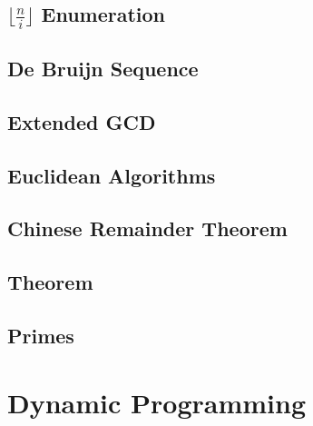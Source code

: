 \documentclass[a4paper,10pt,twocolumn,oneside]{article}
\begin{document}
\subsection{$\lfloor \frac{n}{i} \rfloor$ Enumeration}

\subsection{De Bruijn Sequence}

\subsection{Extended GCD}

\subsection{Euclidean Algorithms}

\subsection{Chinese Remainder Theorem}

% 
% 
% 
\subsection{Theorem}

\subsection{Primes}

\section{Dynamic Programming}
% 
\end{document}
